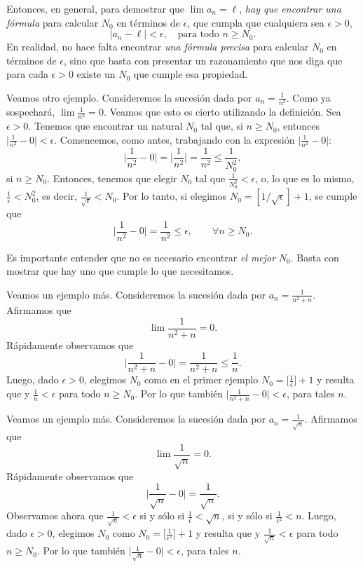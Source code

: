 Entonces, en general, para demostrar que $\lim a_n=\ell$, \emph{hay que encontrar una fórmula} para calcular $N_0$ en términos de $\epsilon$, que cumpla que cualquiera sea $\epsilon > 0$, 
\[
    |a_n - \ell| < \epsilon, \quad \text{para todo $n\ge N_0$}.
\]
En realidad, no hace falta encontrar \emph{una fórmula precisa} para calcular $N_0$ en términos de $\epsilon$, sino que basta con presentar un razonamiento que nos diga que para cada $\epsilon>0$ existe un $N_0$ que cumple esa propiedad.

\begin{example}
Veamos otro ejemplo. Consideremos la sucesión dada por $a_n = \frac1{n^2}$. Como ya sospechará, $\lim \frac1{n^2}=0$. Veamos que esto es cierto utilizando la definición.
Sea $\epsilon>0$. Tenemos que encontrar un natural $N_0$ tal que, si $n\ge N_0$, entonces $\Big|\frac1{n^2}-0\Big|<\epsilon$. Comencemos, como antes, trabajando con la expresión $\Big|\frac1{n^2}-0\Big|$:
\[
\Big|\frac1{n^2}-0\Big| = \Big| \frac1{n^2} \Big| = \frac1{n^2} \le \frac1{N_0^2},
\]
si $n\ge N_0$. Entonces, tenemos que elegir $N_0$ tal que $\frac1{N_0^2} < \epsilon$, o, lo que es lo mismo,
$\frac1\epsilon < N_0^2$, es decir, $\frac1{\sqrt{\epsilon}} < N_0$. Por lo tanto, si elegimos $N_0 = [1/\sqrt{\epsilon}]+1$, se cumple que
\[ 
    \Big|\frac1{n^2}-0\Big| = \frac1{n^2} \le \epsilon, \qquad \forall n\ge N_0.
\]
\end{example}

Es importante entender que no es necesario encontrar \emph{el mejor} $N_0$. Basta con mostrar que hay uno que cumple lo que necesitamos.

\begin{example}
    Veamos un ejemplo más. Consideremos la sucesión dada por $a_n = \frac1{n^2+n}$. Afirmamos que 
    \[
    \lim \frac1{n^2+n} = 0.
    \]
    Rápidamente observamos que 
    \[
    \Big| \frac1{n^2+n} - 0 \Big| = \frac1{n^2+n} \le \frac1n .
    \]
    Luego, dado $\epsilon > 0$, elegimos $N_0$ como en el primer ejemplo $N_0 = \big[\frac1\epsilon\big]+1$ y resulta que 
    y $\frac1n<\epsilon$ para todo $n \ge N_0$. Por lo que también $\big|\frac1{n^2+n}-0\big|<\epsilon$, para tales $n$.
\end{example}

\begin{example}
    Veamos un ejemplo más. Consideremos la sucesión dada por $a_n = \frac1{\sqrt n}$. Afirmamos que 
    \[
    \lim \frac1{\sqrt n} = 0.
    \]
    Rápidamente observamos que 
    \[
    \Big| \frac1{\sqrt n} - 0 \Big| = \frac1{\sqrt n} .
    \]
    Observamos ahora que $\frac1{\sqrt n} < \epsilon $ si y sólo si $\frac1\epsilon < \sqrt n$, si y sólo si $\frac1{\epsilon^2} < n$. Luego, dado $\epsilon > 0$, elegimos $N_0$ como $N_0 = \big[\frac1{\epsilon^2}\big]+1$ y resulta que 
    y $\frac1{\sqrt n}<\epsilon$ para todo $n \ge N_0$. Por lo que también $\big|\frac1{\sqrt n}-0\big|<\epsilon$, para tales $n$.
\end{example}

